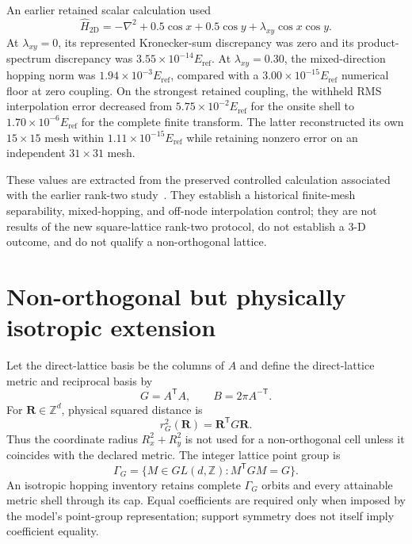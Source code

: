 \documentclass[11pt]{article}
\newcommand{\Z}{\mathbb Z}
\begin{document}
An earlier retained scalar calculation used
\begin{equation}
 \widehat H_{2\mathrm D}=-\nabla^2+0.5\cos x+0.5\cos y
 +\lambda_{xy}\cos x\cos y.
 \label{eq:legacy-2d}
\end{equation}
At $\lambda_{xy}=0$, its represented Kronecker-sum discrepancy was zero and its
product-spectrum discrepancy was $3.55\times10^{-14}E_{\mathrm{ref}}$. At $\lambda_{xy}=0.30$, the
mixed-direction hopping norm was $1.94\times10^{-3}E_{\mathrm{ref}}$, compared with a
$3.00\times10^{-15}E_{\mathrm{ref}}$ numerical floor at zero coupling. On the strongest retained
coupling, the withheld RMS interpolation error decreased from
$5.75\times10^{-2}E_{\mathrm{ref}}$ for the onsite shell to $1.70\times10^{-6}E_{\mathrm{ref}}$ for the complete
finite transform. The latter reconstructed its own $15\times15$ mesh within
$1.11\times10^{-15}E_{\mathrm{ref}}$ while retaining nonzero error on an independent
$31\times31$ mesh.

These values are extracted from the preserved controlled calculation associated with
the earlier rank-two study~\cite{Ragasa2026a}. They establish a historical finite-mesh
separability, mixed-hopping, and off-node
interpolation control; they are not results of the new square-lattice rank-two protocol,
do not establish a 3-D outcome, and do not qualify a non-orthogonal lattice.

\section{Non-orthogonal but physically isotropic extension}

Let the direct-lattice basis be the columns of $A$ and define the direct-lattice metric
and reciprocal basis by
\begin{equation}
 G=A^{\mathsf T}A,
 \qquad B=2\pi A^{-\mathsf T}.
\end{equation}
For $\mathbf R\in\Z^d$, physical squared distance is
\begin{equation}
 r_G^2(\mathbf R)=\mathbf R^{\mathsf T}G\mathbf R.
 \label{eq:metric-radius}
\end{equation}
Thus the coordinate radius $R_x^2+R_y^2$ is not used for a non-orthogonal cell unless it
coincides with the declared metric. The integer lattice point group is
\begin{equation}
 \Gamma_G=\{M\in GL(d,\Z):M^{\mathsf T}GM=G\}.
 \label{eq:metric-group}
\end{equation}
An isotropic hopping inventory retains complete $\Gamma_G$ orbits and every attainable
metric shell through its cap. Equal coefficients are required only when imposed by the
model's point-group representation; support symmetry does not itself imply coefficient
equality.
\end{document}
